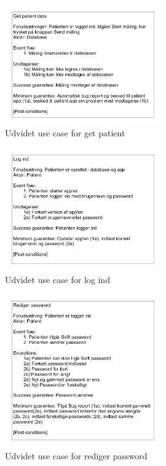 \begin{figure}[H]
\centering
  \includegraphics[width=0.6\textwidth]{Billeder/getpatient.png}
   \caption{Udvidet use case for get patient} 
   \label{fig:hjerte}
\end{figure}




\begin{figure}[H]
\centering
  \includegraphics[width=0.6\textwidth]{Billeder/logind}
   \caption{Udvidet use case for log ind} 
   \label{fig:hjerte}
\end{figure}



\begin{figure}[H]
\centering
  \includegraphics[width=0.6\textwidth]{Billeder/redpass.png}
   \caption{Udvidet use case for rediger password} 
   \label{fig:hjerte}
\end{figure}


